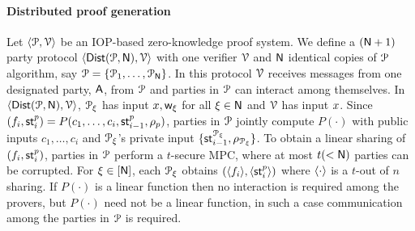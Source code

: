 \paragraph*{Distributed proof generation} 
Let $\langle \mathcal{P},\mathcal{V}\rangle$ be an IOP-based zero-knowledge proof system. We define a $(\mathsf{N} + 1)$ party protocol $\langle \mathsf{Dist}(\mathcal{P}, \mathsf{N}),\mathcal{V}\rangle$ with one verifier $\mathcal{V}$ and $\mathsf{N}$ identical copies of $\mathcal{P}$ algorithm, say $\mathcal{P} = \{\mathcal{P}_1, \ldots, \mathcal{P}_{\mathsf{N}}\}$. In this protocol $\mathcal{V}$ receives messages from one designated party, $\mathsf{A}$, from $\mathcal{P}$ and parties in $\mathcal{P}$ can interact among themselves. In $\langle \mathsf{Dist}(\mathcal{P}, \mathsf{N}),\mathcal{V}\rangle$, $\mathcal{P}_\xi$ has input ${x}, \mathsf{w}_\xi$ for all $\xi \in \mathsf{N}$ and $\mathcal{V}$ has input ${x}$.
Since $(f_i, \mathsf{st}^p_i) = P(c_1, \ldots, c_i, \mathsf{st}^p_{i-1}, \rho_{p})$, parties in $\mathcal{P}$ jointly compute $P(\cdot)$ with public inputs $c_1, \ldots, c_i$ and $\mathcal{P}_\xi$'s private input $\{\mathsf{st}^{\mathcal{P}_\xi}_{i-1}, \rho_{\mathcal{P}_\xi}\}$. To obtain a linear sharing of $(f_i, \mathsf{st}^p_i)$, parties in $\mathcal{P}$ perform a $t$-secure MPC, where at most $t(<\mathsf{N})$ parties can be corrupted. For $\xi \in [\mathsf{N}]$, each $\mathcal{P}_\xi$ obtains $(\langle f_i \rangle, \langle \mathsf{st}^{p}_i \rangle)$ where $\langle \cdot \rangle$ is a $t$-out of $n$ sharing. If $P(\cdot)$ is a linear function then no interaction is required among the provers, but $P(\cdot)$ need not be a linear function, in such a case communication among the parties in $\mathcal{P}$ is required. 


